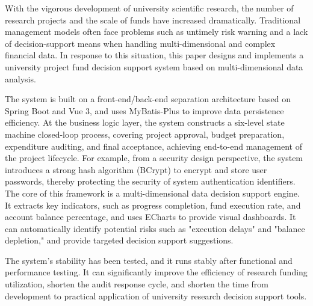 \abstract[Abstract]
{
	With the vigorous development of university scientific research, the number of research projects and the scale of funds have increased dramatically. Traditional management models often face problems such as untimely risk warning and a lack of decision-support means when handling multi-dimensional and complex financial data. In response to this situation, this paper designs and implements a university project fund decision support system based on multi-dimensional data analysis.

    The system is built on a front-end/back-end separation architecture based on Spring Boot and Vue 3, and uses MyBatis-Plus to improve data persistence efficiency. At the business logic layer, the system constructs a six-level state machine closed-loop process, covering project approval, budget preparation, expenditure auditing, and final acceptance, achieving end-to-end management of the project lifecycle. For example, from a security design perspective, the system introduces a strong hash algorithm (BCrypt) to encrypt and store user passwords, thereby protecting the security of system authentication identifiers. The core of this framework is a multi-dimensional data decision support engine. It extracts key indicators, such as progress completion, fund execution rate, and account balance percentage, and uses ECharts to provide visual dashboards. It can automatically identify potential risks such as "execution delays" and "balance depletion," and provide targeted decision support suggestions.
    
    The system's stability has been tested, and it runs stably after functional and performance testing. It can significantly improve the efficiency of research funding utilization, shorten the audit response cycle, and shorten the time from development to practical application of university research decision support tools.
}
